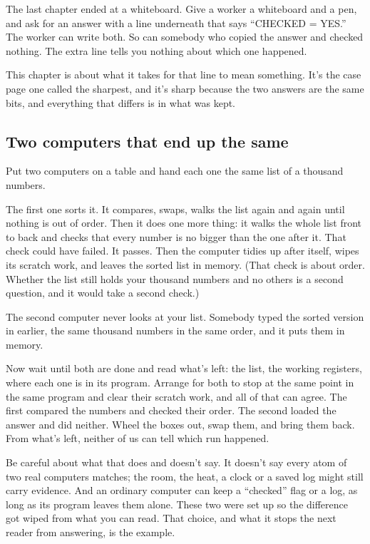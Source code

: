 \documentclass[11pt,twoside]{article}
\theoremstyle{thielethm}
\theoremstyle{thieledef}
\theoremstyle{thieledef}
\theoremstyle{thieledef}
\theoremstyle{thielethm}
\theoremstyle{thieleobs}
\theoremstyle{thielethm}
\begin{document}
The last chapter ended at a whiteboard. Give a worker a whiteboard and a pen, and ask for an answer with a line underneath that says ``CHECKED = YES.'' The worker can write both. So can somebody who copied the answer and checked nothing. The extra line tells you nothing about which one happened.

This chapter is about what it takes for that line to mean something. It's the case page one called the sharpest, and it's sharp because the two answers are the same bits, and everything that differs is in what was kept.

\subsection{Two computers that end up the same}

Put two computers on a table and hand each one the same list of a thousand numbers.

The first one sorts it. It compares, swaps, walks the list again and again until nothing is out of order. Then it does one more thing: it walks the whole list front to back and checks that every number is no bigger than the one after it. That check could have failed. It passes. Then the computer tidies up after itself, wipes its scratch work, and leaves the sorted list in memory. (That check is about order. Whether the list still holds your thousand numbers and no others is a second question, and it would take a second check.)

The second computer never looks at your list. Somebody typed the sorted version in earlier, the same thousand numbers in the same order, and it puts them in memory.

Now wait until both are done and read what's left: the list, the working registers, where each one is in its program. Arrange for both to stop at the same point in the same program and clear their scratch work, and all of that can agree. The first compared the numbers and checked their order. The second loaded the answer and did neither. Wheel the boxes out, swap them, and bring them back. From what's left, neither of us can tell which run happened.

Be careful about what that does and doesn't say. It doesn't say every atom of two real computers matches; the room, the heat, a clock or a saved log might still carry evidence. And an ordinary computer can keep a ``checked'' flag or a log, as long as its program leaves them alone. These two were set up so the difference got wiped from what you can read. That choice, and what it stops the next reader from answering, is the example.
\end{document}
